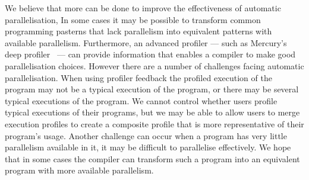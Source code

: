 

We believe that more can be done to improve the effectiveness of
automatic parallelisation,
In some cases it may be possible to transform common programming
pasterns that lack parallelism into equivalent patterns with available
parallelism.
Furthermore, an advanced profiler --- such as Mercury's deep
profiler~\citep{conway:2001:mercury-deep} --- can provide information
that enables a compiler to make good parallelisation choices.
However there are a number of challenges facing automatic
parallelisation.
When using profiler feedback the profiled execution of the program may
not be a typical execution of the program, or there may be several
typical executions of the program.
We cannot control whether users profile typical executions of their
programs, but we may be able to allow users to merge execution
profiles to create a composite profile that is more representative of
their program's usage.
Another challenge can occur when a program has very little parallelism
available in it, it may be difficult to parallelise effectively.
We hope that in some cases the compiler can transform such a program
into an equivalent program with more available parallelism.

%
